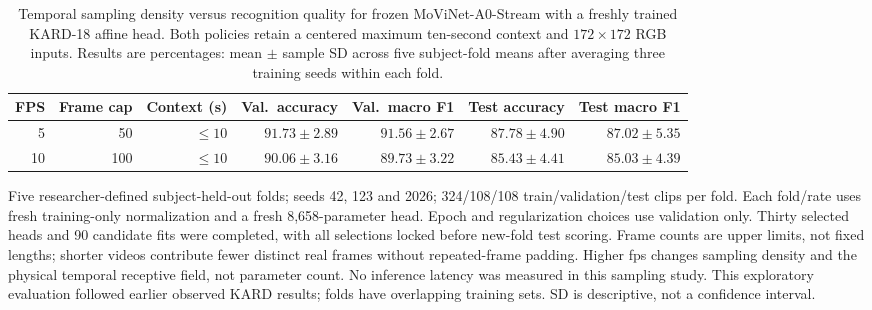 \begin{table}[t]
\centering
\small
\caption{Temporal sampling density versus recognition quality for frozen MoViNet-A0-Stream with a freshly trained KARD-18 affine head. Both policies retain a centered maximum ten-second context and $172\times172$ RGB inputs. Results are percentages: mean $\pm$ sample SD across five subject-fold means after averaging three training seeds within each fold.}
\label{tab:kard-temporal-sampling}
\setlength{\tabcolsep}{4pt}
\begin{tabular*}{\textwidth}{@{\extracolsep{\fill}}rrrrrrr@{}}
\toprule
FPS & Frame cap & Context (s) & Val.\ accuracy & Val.\ macro F1 & Test accuracy & Test macro F1 \\
\midrule
5 & 50 & $\leq10$ & $91.73 \pm 2.89$ & $91.56 \pm 2.67$ & $87.78 \pm 4.90$ & $87.02 \pm 5.35$ \\
10 & 100 & $\leq10$ & $90.06 \pm 3.16$ & $89.73 \pm 3.22$ & $85.43 \pm 4.41$ & $85.03 \pm 4.39$ \\
\bottomrule
\end{tabular*}
\par\smallskip
\begin{minipage}{\textwidth}\footnotesize
Five researcher-defined subject-held-out folds; seeds 42, 123 and 2026; 324/108/108 train/validation/test clips per fold. Each fold/rate uses fresh training-only normalization and a fresh 8,658-parameter head. Epoch and regularization choices use validation only. Thirty selected heads and 90 candidate fits were completed, with all selections locked before new-fold test scoring. Frame counts are upper limits, not fixed lengths; shorter videos contribute fewer distinct real frames without repeated-frame padding. Higher fps changes sampling density and the physical temporal receptive field, not parameter count. No inference latency was measured in this sampling study. This exploratory evaluation followed earlier observed KARD results; folds have overlapping training sets. SD is descriptive, not a confidence interval.
\end{minipage}
\end{table}
